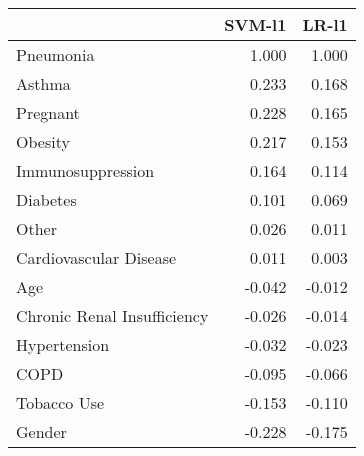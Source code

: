 \begin{tabular}{lrr}
\toprule
{} &  SVM-l1 &  LR-l1 \\
\midrule
Pneumonia                   &   1.000 &  1.000 \\
Asthma                      &   0.233 &  0.168 \\
Pregnant                    &   0.228 &  0.165 \\
Obesity                     &   0.217 &  0.153 \\
Immunosuppression           &   0.164 &  0.114 \\
Diabetes                    &   0.101 &  0.069 \\
Other                       &   0.026 &  0.011 \\
Cardiovascular Disease      &   0.011 &  0.003 \\
Age                         &  -0.042 & -0.012 \\
Chronic Renal Insufficiency &  -0.026 & -0.014 \\
Hypertension                &  -0.032 & -0.023 \\
COPD                        &  -0.095 & -0.066 \\
Tobacco Use                 &  -0.153 & -0.110 \\
Gender                      &  -0.228 & -0.175 \\
\bottomrule
\end{tabular}
